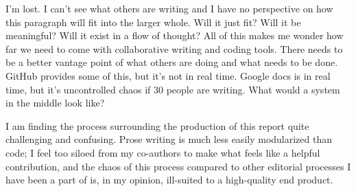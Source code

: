 I'm lost. I can't see what others are writing and I have no perspective on how this paragraph will fit into the larger whole. Will it just fit? Will it be meaningful? Will it exist in a flow of thought? All of this makes me wonder how far we need to come with collaborative writing and coding tools. There needs to be a better vantage point of what others are doing and what needs to be done. GitHub provides some of this, but it's not in real time. Google docs is in real time, but it's uncontrolled chaos if 30 people are writing. What would a system in the middle look like?

I am finding the process surrounding the production of this report quite challenging and confusing. Prose writing is much less easily modularized than code; I feel too siloed from my co-authors to make what feels like a helpful contribution, and the chaos of this process compared to other editorial processes I have been a part of is, in my opinion, ill-suited to a high-quality end product. 
